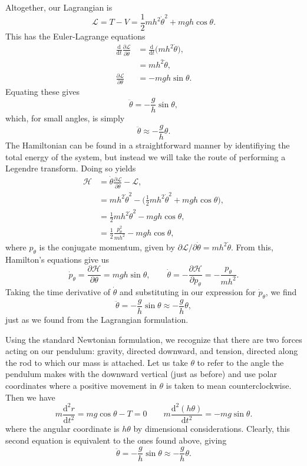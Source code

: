 \documentclass[../road-to-reality.tex]{subfiles}
\begin{document}
\begin{questions}
\begin{solution}
    Altogether, our Lagrangian is
    \[
      \mathcal{L} = T - V = \frac{1}{2}mh^2\dot{\theta}^2 + mgh\cos\theta.
    \]
    This has the Euler-Lagrange equations
    \begin{align*}
      \frac{\mathrm{d}}{\mathrm{d}t}\frac{\partial\mathcal{L}}{\partial{\dot{\theta}}} &= \frac{\mathrm{d}}{\mathrm{d}t}\Big(mh^2\dot{\theta}\Big), \\
                                                                                       &= mh^2\ddot{\theta}, \\
      \frac{\partial\mathcal{L}}{\partial{\theta}} &= -mgh\sin\theta.
    \end{align*}
    Equating these gives
    \[
      \ddot{\theta} = -\frac{g}{h}\sin\theta,
    \]
    which, for small angles, is simply
    \[
      \ddot{\theta} \approx - \frac{g}{h}\theta.
    \]
    The Hamiltonian can be found in a straightforward manner by identifiying the
    total energy of the system, but instead we will take the route of performing
    a Legendre transform. Doing so yields
    \begin{align*}
      \mathcal{H} &= \dot{\theta}\frac{\partial\mathcal{L}}{\partial\dot{\theta}} - \mathcal{L}, \\
                 &= mh^2\dot{\theta}^2 - \Big(\frac{1}{2}mh^2\dot{\theta}^2 + mgh\cos\theta\Big), \\
                 &= \frac{1}{2}mh^2\dot{\theta}^2 - mgh\cos\theta, \\
                 &= \frac{1}{2}\frac{p_{\theta}^2}{mh^2} - mgh\cos\theta,
    \end{align*}
    where $p_{\theta}$ is the conjugate momentum, given by
    $\partial\mathcal{L}/\partial\dot{\theta} = mh^2\dot{\theta}$.
    From this, Hamilton's equations give us
    \[
      \dot{p}_{\theta} = \frac{\partial{\mathcal{H}}}{\partial{\theta}} =
      mgh\sin\theta, \qquad \dot{\theta} =
      -\frac{\partial{\mathcal{H}}}{\partial{p_{\theta}}} =
      -\frac{p_{\theta}}{mh^2}.
    \]
    Taking the time derivative of $\dot{\theta}$ and substituting in our
    expression for $\dot{p}_{\theta}$, we find
    \[
      \ddot{\theta} = -\frac{g}{h}\sin\theta \approx -\frac{g}{h}\theta,
    \]
    just as we found from the Lagrangian formulation.

    Using the standard Newtonian formulation, we recognize that there are two
    forces acting on our pendulum: gravity, directed downward, and tension,
    directed along the rod to which our mass is attached. Let us take $\theta$ to
    refer to the angle the pendulum makes with the downward vertical (just as
    before) and use polar coordinates where a positive movement in $\theta$ is
    taken to mean counterclockwise. Then we have
    \[
      m\frac{\mathrm{d}^2r}{\mathrm{d}t^2} = mg\cos\theta - T = 0 \qquad m\frac{\mathrm{d}^2(h\theta)}{\mathrm{d}t^2} = -mg\sin\theta.
    \]
    where the angular coordinate is $h\theta$ by dimensional considerations.
    Clearly, this second equation is equivalent to the ones found above, giving
    \[
      \ddot{\theta} = -\frac{g}{h}\sin\theta \approx - \frac{g}{h}\theta.
    \]
  \end{solution}


\end{questions}
\end{document}
